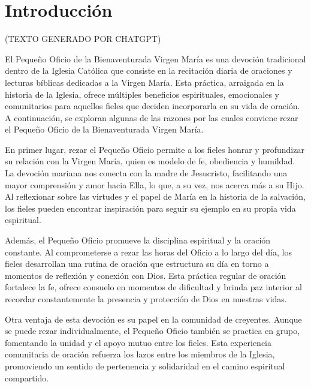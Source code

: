 \documentclass[12pt,a5paper,openright]{memoir}
\begin{document}
\cleardoublepage



\renewcommand{\thepage}{\roman{page}}

\setcounter{page}{1}

\tableofcontents*







\cleardoublepage
\chapter*{Introducción}


(TEXTO GENERADO POR CHATGPT)

El Pequeño Oficio de la Bienaventurada Virgen María es una devoción tradicional dentro de la Iglesia Católica que consiste en la recitación diaria de oraciones y lecturas bíblicas dedicadas a la Virgen María. Esta práctica, arraigada en la historia de la Iglesia, ofrece múltiples beneficios espirituales, emocionales y comunitarios para aquellos fieles que deciden incorporarla en su vida de oración. A continuación, se exploran algunas de las razones por las cuales conviene rezar el Pequeño Oficio de la Bienaventurada Virgen María.

En primer lugar, rezar el Pequeño Oficio permite a los fieles honrar y profundizar su relación con la Virgen María, quien es modelo de fe, obediencia y humildad. La devoción mariana nos conecta con la madre de Jesucristo, facilitando una mayor comprensión y amor hacia Ella, lo que, a su vez, nos acerca más a su Hijo. Al reflexionar sobre las virtudes y el papel de María en la historia de la salvación, los fieles pueden encontrar inspiración para seguir su ejemplo en su propia vida espiritual.

Además, el Pequeño Oficio promueve la disciplina espiritual y la oración constante. Al comprometerse a rezar las horas del Oficio a lo largo del día, los fieles desarrollan una rutina de oración que estructura su día en torno a momentos de reflexión y conexión con Dios. Esta práctica regular de oración fortalece la fe, ofrece consuelo en momentos de dificultad y brinda paz interior al recordar constantemente la presencia y protección de Dios en nuestras vidas.

Otra ventaja de esta devoción es su papel en la comunidad de creyentes. Aunque se puede rezar individualmente, el Pequeño Oficio también se practica en grupo, fomentando la unidad y el apoyo mutuo entre los fieles. Esta experiencia comunitaria de oración refuerza los lazos entre los miembros de la Iglesia, promoviendo un sentido de pertenencia y solidaridad en el camino espiritual compartido.
\end{document}

